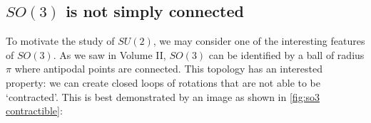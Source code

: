 \subsection{$SO(3)$ is not simply connected}
To motivate the study of $SU(2)$, we may consider one of the interesting features of $SO(3)$. As we saw in Volume II, $SO(3)$ can be identified by a ball of radius $\pi$ where antipodal points are connected. This topology has an interested property: we can create closed loops of rotations that are not able to be `contracted'. This is best demonstrated by an image as shown in \autoref{fig:so3 contractible}:
\begin{figure}[ht]
    \centering




\begin{tikzpicture}[x=0.75pt,y=0.75pt,yscale=-1,xscale=1]


\end{tikzpicture}
\end{figure}
